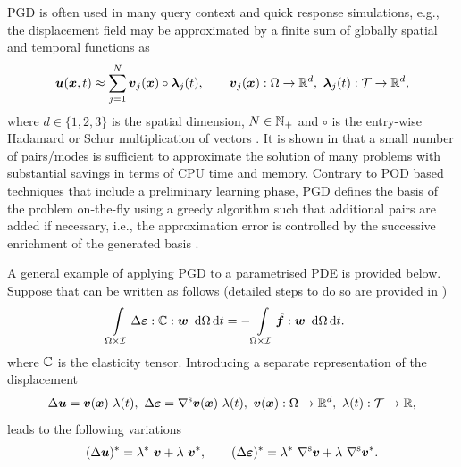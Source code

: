 PGD is often used in many query context and quick response simulations, e.g., the displacement field may be approximated by a finite sum of globally spatial and temporal functions as
\begin{equation}
	{\mbox{$\bm  u$}}(\mbox{$\bm  x$},t) \approx \displaystyle  \sum_{j=1}^{N} {\mbox{$\bm  v$}}_j(\mbox{$\bm  x$}) \circ \mbox{$\bm \lambda$}_j(t) , {\qquad {\mbox{$\bm  v$}}_j(\mbox{$\bm  x$}):\Omega \rightarrow {\mathbb{ R}}^{d},\  \mbox{$\bm \lambda$}_j(t):{\cal T} \rightarrow {\mathbb{ R}}^{d},}
\end{equation}
where {$d\in\{1,2,3\}$ is the spatial dimension}, $N\in{\mathbb{ N}}_{+}$ and $\circ$ is the entry-wise Hadamard or Schur multiplication of vectors \parencite{chinesta2014separated,cueto2016proper}. It is shown in \parencite{chinesta2014separated} that a small number of pairs/modes is sufficient to approximate the solution of many problems with substantial savings in terms of CPU time and memory. Contrary to POD based techniques that include a preliminary learning phase, PGD defines the basis of the problem on-the-fly using a greedy algorithm such that additional pairs are added if necessary, i.e., the approximation error is controlled by the successive enrichment of the generated basis \parencite{chinesta2013proper}.


A general example of applying PGD to a parametrised PDE is provided below. Suppose that  can be written as follows (detailed steps to do so are provided in )
\begin{equation}
	\begin{split}
		\int \displaylimits_{\Omega \times {\cal I}}  \Delta{\mbox{$\bm \varepsilon $}} : {\mathbb{ C}}   : {\mbox{$\bm  w$}}\ {\,\rm d} \Omega {\,\rm d} t                      & = - \int \displaylimits_{\Omega \times {\cal I}} \mbox{\ensuremath{\hat{\bm f}}} : {\mbox{$\bm  w$}}\ {\,\rm d} \Omega {\,\rm d} t .
	\end{split}
	\label{eq_balance_parametric}
\end{equation}
where ${\mathbb{ C}}$ is the elasticity tensor. Introducing a separate representation of the displacement
\begin{equation}
	\Delta \fu = {\fv}(\fx) \contraction \lambda(t) , \ \Delta \feps = \grads{\fv}(\fx) \contraction \lambda(t) , {\ {\fv}(\fx):\Omega \rightarrow \ffR^{d},\  \lambda(t):\cT \rightarrow \ffR,}
\end{equation}
leads to the following variations
\begin{equation}
	(\Delta \mbox{$\bm  u$})^\ast = \lambda^\ast \  \mbox{$\bm  v$} + \lambda \  \mbox{$\bm  v$}^\ast, \qquad  (\Delta \mbox{$\bm \varepsilon $})^\ast = \lambda^\ast \  {\rm \nabla^s} \mbox{$\bm  v$} + \lambda \  {\rm \nabla^s} \mbox{$\bm  v$}^\ast.
	\label{eq_spatial_temporal_unknowns}
\end{equation}

